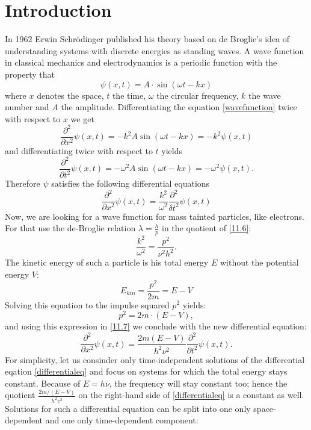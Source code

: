 \chapter{Introduction}

In 1962 Erwin Schrödinger published his theory based on de Broglie's idea of understanding systems with discrete energies as standing waves. A wave function in classical mechanics and electrodynamics is a periodic function with the property that
	\begin{equation}
		\psi(x, t) = A \cdot \sin( \omega t - kx) \label{wavefunction}
	\end{equation} 
where $x$ denotes the space, $t$ the time, $\omega$ the circular frequency, $k$ the wave number and $A$ the amplitude. Differentiating the equation \eqref{wavefunction} twice with respect to $x$ we get
	\[ \frac{\partial^{2}}{\partial x^{2}} \psi(x, t) = -k^{2} A \sin( \omega t - kx) = -k^{2} \psi(x, t) \]
and differentiating twice with respect to $t$ yields
	\[ \frac{\partial^{2}}{\partial t^{2}} \psi(x, t)  = -\omega^{2} A \sin( \omega t - kx) = -\omega^{2} \psi(x, t). \]
Therefore $\psi$ satisfies the following differential equations
	\begin{equation}
		 \frac{\partial^{2}}{\partial x^{2}} \psi(x, t) = \frac{k^{2}}{\omega^{2}} \frac{\partial^{2}}{\delta t^{2}} \psi(x, t) \label{11.6}
	\end{equation}
Now, we are looking for a wave function for mass tainted particles, like electrons. For that use the de-Broglie relation $\lambda = \frac{h}{p}$ in the quotient of \eqref{11.6}:
	\begin{equation}
		\frac{k^{2}}{\omega^{2}} = \frac{p^{2}}{\nu^{2} h^{2}}. \label{11.7}
	\end{equation} 
The kinetic energy of such a particle is his total energy $E$ without the potential energy $V$:
	\[ E_{kin} = \frac{p^{2}}{2m} = E - V \]
Solving this equation to the impulse squared $p^{2}$ yields:
	\[ p^{2} = 2m \cdot ( E - V), \]
and using this expression in \eqref{11.7} we conclude with the new differential equation:
	\begin{equation} 
		 \frac{\partial^{2}}{\partial x^{2}} \psi(x, t) = \frac{2m (E - V)}{h^{2} \nu^{2}} \frac{\partial^{2}}{\partial t^{2}} \psi(x, t). \label{differentialeq}
	\end{equation}
For simplicity, let us consinder only time-independent solutions of the differential eqation \eqref{differentialeq} and focus on systems for which the total energy stays constant. Because of $E = h \nu$, the frequency will stay constant too; hence the  quotient $\frac{2m/(E-V)}{h^{2}v^{2}}$ on the right-hand side of \eqref{differentialeq} is a constant as well. Solutions for such a differential equation can be split into one only space-dependent and one only time-dependent component:
